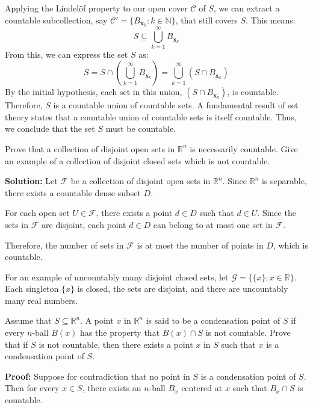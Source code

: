 Applying the Lindelöf property to our open cover $\mathcal{C}$ of $S$, we can extract a countable subcollection, say $\mathcal{C}' = \{B_{\mathbf{x}_k} : k \in \mathbb{N}\}$, that still covers $S$. This means:
$$S \subseteq \bigcup_{k=1}^{\infty} B_{\mathbf{x}_k}$$
From this, we can express the set $S$ as:
$$S = S \cap \left( \bigcup_{k=1}^{\infty} B_{\mathbf{x}_k} \right) = \bigcup_{k=1}^{\infty} (S \cap B_{\mathbf{x}_k})$$
By the initial hypothesis, each set in this union, $(S \cap B_{\mathbf{x}_k})$, is countable.
Therefore, $S$ is a countable union of countable sets. A fundamental result of set theory states that a countable union of countable sets is itself countable. Thus, we conclude that the set $S$ must be countable.


\begin{problembox}
Prove that a collection of disjoint open sets in \( \mathbb{R}^n \) is necessarily countable. Give an example of a collection of disjoint closed sets which is not countable.
\end{problembox}

\textbf{Solution:} Let $\mathcal{F}$ be a collection of disjoint open sets in $\mathbb{R}^n$. Since $\mathbb{R}^n$ is separable, there exists a countable dense subset $D$.

For each open set $U \in \mathcal{F}$, there exists a point $d \in D$ such that $d \in U$. Since the sets in $\mathcal{F}$ are disjoint, each point $d \in D$ can belong to at most one set in $\mathcal{F}$.

Therefore, the number of sets in $\mathcal{F}$ is at most the number of points in $D$, which is countable.

For an example of uncountably many disjoint closed sets, let $\mathcal{G} = \{\{x\} : x \in \mathbb{R}\}$. Each singleton $\{x\}$ is closed, the sets are disjoint, and there are uncountably many real numbers.

\begin{problembox}
Assume that \( S \subseteq \mathbb{R}^n \). A point \( x \) in \( \mathbb{R}^n \) is said to be a condensation point of \( S \) if every \( n \)-ball \( B(x) \) has the property that \( B(x) \cap S \) is not countable. Prove that if \( S \) is not countable, then there exists a point \( x \) in \( S \) such that \( x \) is a condensation point of \( S \).
\end{problembox}

\textbf{Proof:} Suppose for contradiction that no point in $S$ is a condensation point of $S$. Then for every $x \in S$, there exists an $n$-ball $B_x$ centered at $x$ such that $B_x \cap S$ is countable.

